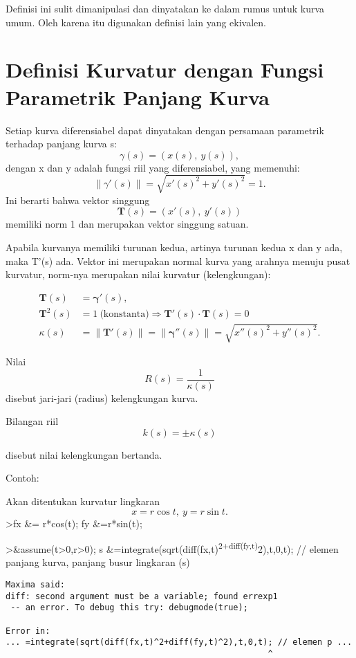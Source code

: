 \documentclass[
]{book}
\begin{document}
Definisi ini sulit dimanipulasi dan dinyatakan ke dalam rumus untuk kurva umum. Oleh karena itu digunakan definisi lain yang ekivalen.

\section{Definisi Kurvatur dengan Fungsi Parametrik Panjang Kurva}\label{definisi-kurvatur-dengan-fungsi-parametrik-panjang-kurva}

Setiap kurva diferensiabel dapat dinyatakan dengan persamaan parametrik terhadap panjang kurva s: \[\gamma(s) = (x(s),\ y(s)),\]dengan x dan y adalah fungsi riil yang diferensiabel, yang memenuhi: \[\|\gamma'(s)\|=\sqrt{x'(s)^2+y'(s)^2}=1.\]Ini berarti bahwa vektor singgung \[\mathbf{T}(s)=(x'(s),\ y'(s))\]memiliki norm 1 dan merupakan vektor singgung satuan.

Apabila kurvanya memiliki turunan kedua, artinya turunan kedua x dan y ada, maka T'(s) ada. Vektor ini merupakan normal kurva yang arahnya menuju pusat kurvatur, norm-nya merupakan nilai kurvatur (kelengkungan):

\[\begin{aligned}\mathbf{T}(s) &= \mathbf{\gamma}'(s),\\ \mathbf{T}^{2}(s) &=1\ \text{(konstanta)}\Rightarrow \mathbf{T}'(s)\cdot \mathbf{T}(s)=0\\ \kappa(s) &=\|\mathbf {T}'(s)\|= \|\mathbf{\gamma}''(s)\|=\sqrt{x''(s)^{2}+y''(s)^{2}}.\end{aligned}\]

Nilai \[R(s)=\frac{1}{\kappa(s)}\]disebut jari-jari (radius) kelengkungan kurva.

Bilangan riil \[k(s) = \pm\kappa(s)\]

disebut nilai kelengkungan bertanda.

Contoh:

Akan ditentukan kurvatur lingkaran \[x=r\cos t,\ y= r\sin t.\]\textgreater fx \&= r*cos(t); fy \&=r*sin(t);

\textgreater\&assume(t\textgreater0,r\textgreater0); s \&=integrate(sqrt(diff(fx,t)\textsuperscript{2+diff(fy,t)}2),t,0,t); // elemen panjang kurva, panjang busur lingkaran (s)

\begin{verbatim}
Maxima said:
diff: second argument must be a variable; found errexp1
 -- an error. To debug this try: debugmode(true);

Error in:
... =integrate(sqrt(diff(fx,t)^2+diff(fy,t)^2),t,0,t); // elemen p ...
                                                     ^
\end{verbatim}
\end{document}
